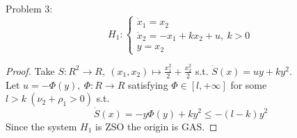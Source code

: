     Problem 3:
    $$H_1: \left\{
                \begin{array}{ll}
                  \dot x_1 = x_2\\
                  \dot x_2 = -x_1 + kx_2 + u, \ k>0 \\
                  y = x_2
                \end{array}
              \right.$$
    \begin{proof}
        Take $S:R^2 \rightarrow R, \ (x_1,x_2) \mapsto \frac{x_1^2}{2}+\frac{x_2^2}{2}$ s.t. $\dot S(x) = uy + ky^2$. \\ 
        Let $u = -\Phi(y), \ \Phi: R \rightarrow R$ satisfying $\Phi \in [l,+\infty]$ for some $l>k \ (\nu_2+\rho_1 > 0)$ s.t. 
        $$\dot S(x) = -y\Phi(y)+ky^2 \le -(l-k)y^2$$
        Since the system $H_1$ is ZSO the origin is GAS.
    \end{proof}
    
